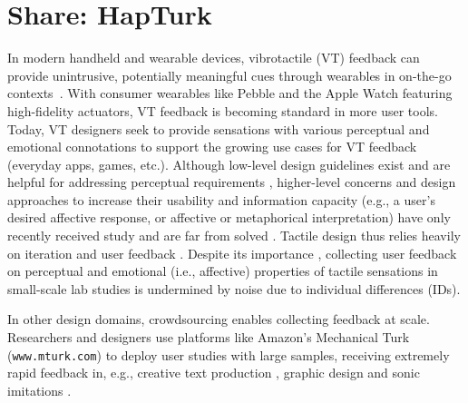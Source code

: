
\chapter{Share: HapTurk}
\label{ch:hapturk}

%

   In modern handheld and wearable devices, vibrotactile (VT) feedback can provide unintrusive, potentially meaningful cues through wearables in on-the-go contexts~\cite{Brunet2013a}.
    With %
    consumer wearables like Pebble and the Apple Watch featuring high-fidelity actuators, VT feedback is becoming standard  in more user tools.
    Today, VT designers seek to provide sensations with various perceptual and emotional connotations to support the growing use cases for VT feedback (everyday apps, games, etc.).
    Although low-level design guidelines exist and are helpful for addressing perceptual requirements \cite{maclean2003perceptual,InwookHwang2013,Ternes2008,Brewster2004,Brown2006a},  higher-level concerns and design approaches to increase their usability and information capacity (e.g., a user's desired affective response, or affective or metaphorical interpretation) have only recently received study and are far from solved \cite{Obrist2013,Arab2015,Seifi2014,Israr2014,Jansson-Boyd2011,Okamoto2013}.
    Tactile design thus relies heavily on iteration and user feedback \cite{Schneider2014}. Despite its importance \cite{Seifi2014,Seifi2015}, collecting user feedback on perceptual and emotional (i.e., affective) properties  of tactile sensations in small-scale lab studies is undermined by noise due to individual differences (IDs). %
    

    In other design domains, crowdsourcing  enables collecting feedback at scale.
    Researchers and designers use platforms like Amazon's Mechanical Turk %
    (\texttt{www.mturk.com}) to deploy user studies with large samples, receiving extremely rapid feedback in, e.g., creative text production \cite{Siangliulue2015}, graphic design \cite{Xu2014} and sonic imitations \cite{Cartwright2015}.
    

